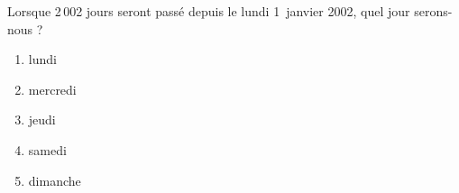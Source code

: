 Lorsque 2\,002 jours seront passé depuis le lundi 1\ier\ janvier 2002, quel jour serons-nous ?
\begin{multicols}{5}
  \begin{enumerate}[A/]
  \item lundi
  \item mercredi
  \item jeudi
  \item samedi
  \item dimanche
  \end{enumerate}
\end{multicols}